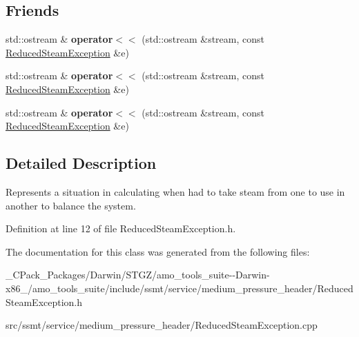 \subsection*{Friends}
\begin{DoxyCompactItemize}
\item 
\mbox{\label{class_reduced_steam_exception_a3cd872374fda196fb46af1212dafa45d}} 
std\+::ostream \& {\bfseries operator$<$$<$} (std\+::ostream \&stream, const \hyperlink{class_reduced_steam_exception}{Reduced\+Steam\+Exception} \&e)
\item 
\mbox{\label{class_reduced_steam_exception_a3cd872374fda196fb46af1212dafa45d}} 
std\+::ostream \& {\bfseries operator$<$$<$} (std\+::ostream \&stream, const \hyperlink{class_reduced_steam_exception}{Reduced\+Steam\+Exception} \&e)
\item 
\mbox{\label{class_reduced_steam_exception_a3cd872374fda196fb46af1212dafa45d}} 
std\+::ostream \& {\bfseries operator$<$$<$} (std\+::ostream \&stream, const \hyperlink{class_reduced_steam_exception}{Reduced\+Steam\+Exception} \&e)
\end{DoxyCompactItemize}


\subsection{Detailed Description}
Represents a situation in calculating when had to take steam from one to use in another to balance the system. 

Definition at line 12 of file Reduced\+Steam\+Exception.\+h.



The documentation for this class was generated from the following files\+:\begin{DoxyCompactItemize}
\item 
\+\_\+\+C\+Pack\+\_\+\+Packages/\+Darwin/\+S\+T\+G\+Z/amo\+\_\+tools\+\_\+suite-\/-\/\+Darwin-\/x86\+\_/amo\+\_\+tools\+\_\+suite/include/ssmt/service/medium\+\_\+pressure\+\_\+header/Reduced\+Steam\+Exception.\+h\item 
src/ssmt/service/medium\+\_\+pressure\+\_\+header/Reduced\+Steam\+Exception.\+cpp\end{DoxyCompactItemize}
